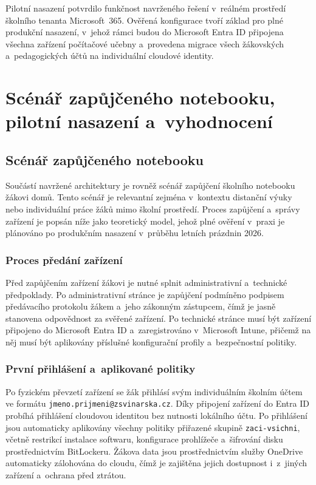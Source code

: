 \documentclass[male,czech,api_bc]{kitheses}
\begin{document}
Pilotní nasazení potvrdilo funkčnost navrženého řešení v~reálném prostředí 
školního tenanta Microsoft~365. Ověřená konfigurace tvoří základ pro plné 
produkční nasazení, v~jehož rámci budou do Microsoft Entra ID připojena 
všechna zařízení počítačové učebny a~provedena migrace všech žákovských 
a~pedagogických účtů na individuální cloudové identity.

\chapter{Scénář zapůjčeného notebooku, pilotní nasazení a~vyhodnocení}

\section{Scénář zapůjčeného notebooku}

Součástí navržené architektury je rovněž scénář zapůjčení školního notebooku 
žákovi domů. Tento scénář je relevantní zejména v~kontextu distanční výuky 
nebo individuální práce žáků mimo školní prostředí. Proces zapůjčení 
a~správy zařízení je popsán níže jako teoretický model, jehož plné ověření 
v~praxi je plánováno po produkčním nasazení v~průběhu letních prázdnin 2026.

\subsection{Proces předání zařízení}

Před zapůjčením zařízení žákovi je nutné splnit administrativní 
a~technické předpoklady. Po administrativní stránce je zapůjčení 
podmíněno podpisem předávacího protokolu žákem a~jeho zákonným zástupcem, 
čímž je jasně stanovena odpovědnost za svěřené zařízení. Po technické 
stránce musí být zařízení připojeno do Microsoft Entra ID a~zaregistrováno 
v~Microsoft Intune, přičemž na něj musí být aplikovány příslušné 
konfigurační profily a~bezpečnostní politiky.

\subsection{První přihlášení a~aplikované politiky}

Po fyzickém převzetí zařízení se žák přihlásí svým individuálním školním 
účtem ve formátu \texttt{jmeno.prijmeni@zsvinarska.cz}. Díky připojení 
zařízení do Entra ID probíhá přihlášení cloudovou identitou bez nutnosti 
lokálního účtu. Po přihlášení jsou automaticky aplikovány všechny politiky 
přiřazené skupině \texttt{zaci-vsichni}, včetně restrikcí instalace 
softwaru, konfigurace prohlížeče a~šifrování disku prostřednictvím 
BitLockeru. Žákova data jsou prostřednictvím služby OneDrive automaticky 
zálohována do cloudu, čímž je zajištěna jejich dostupnost i~z~jiných 
zařízení a~ochrana před ztrátou.
\end{document}
